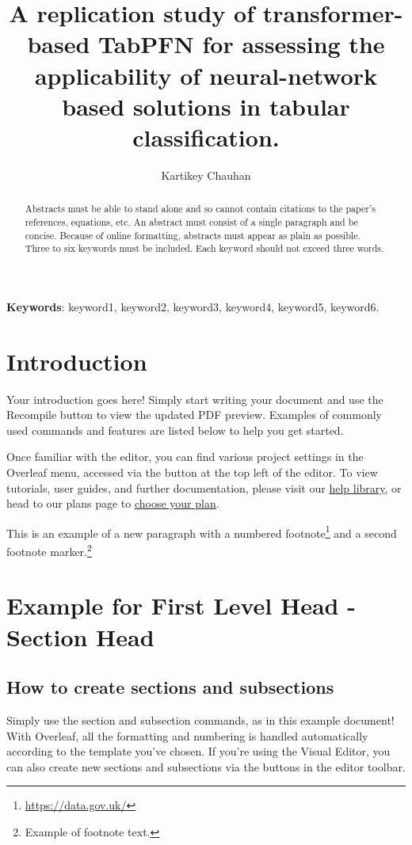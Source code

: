 \documentclass[12pt,a4paper]{article}
\title{A replication study of transformer-based TabPFN for assessing the applicability of neural-network based solutions in tabular classification.}
\author[1]{Kartikey Chauhan}
\affil[1]{\small Department, Organization, Street, City, 100190, State, Country}
\affil[2]{Department, Organization, Street, City, 10587, State, Country}
\affil[3]{Department, Organization, Street, City, 610101, State, Country}
\affil[*]{Corresponding author: \texttt{user\_id@university.edu}}
\date{}  %
\begin{document}
\maketitle

\begin{abstract}
Abstracts must be able to stand alone and so cannot contain citations to the paper’s references, equations, etc. An abstract must consist of a single paragraph and be concise. Because of online formatting, abstracts must appear as plain as possible. Three to six keywords must be included. Each keyword should not exceed three words. %
\end{abstract}

\textbf{Keywords}: keyword1, keyword2, keyword3, keyword4, keyword5, keyword6.  

\section{Introduction}

Your introduction goes here! Simply start writing your document and use the Recompile button to view the updated PDF preview. Examples of commonly used commands and features are listed below to help you get started.
\lipsum[2]

Once familiar with the editor, you can find various project settings in the Overleaf menu, accessed via the button at the top left of the editor. To view tutorials, user guides, and further documentation, please visit our \href{https://www.overleaf.com/learn}{help library}, or head to our plans page to \href{https://www.overleaf.com/user/subscription/plans}{choose your plan}. 

This is an example of a new paragraph with a numbered footnote\footnote{\url{https://data.gov.uk/}} and a second footnote marker.\footnote{Example of footnote text.}


\section{Example for First Level Head - Section Head}\label{sec2}

\lipsum[4]

\lipsum[4]


\subsection{How to create sections and subsections}
Simply use the section and subsection commands, as in this example document! With Overleaf, all the formatting and numbering is handled automatically according to the template you've chosen. If you're using the Visual Editor, you can also create new sections and subsections via the buttons in the editor toolbar.
\end{document}
